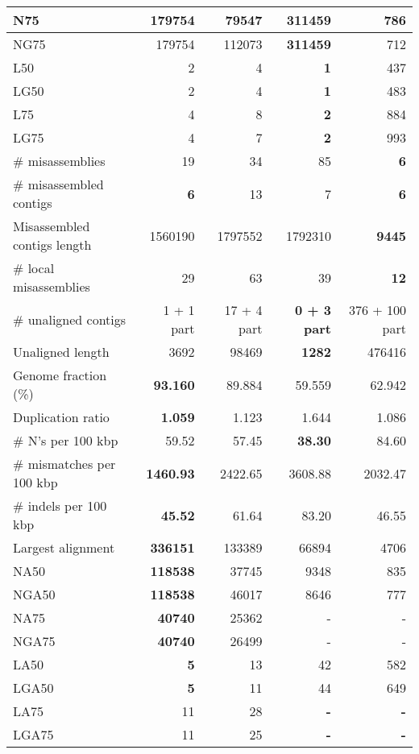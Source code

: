\documentclass[12pt,a4paper]{article}
\begin{document}
\begin{table}[ht]
\begin{center}
\begin{tabular}{|l*{4}{|r}|}
N75 & 179754 & 79547 & {\bf 311459} & 786 \\ \hline
NG75 & 179754 & 112073 & {\bf 311459} & 712 \\ \hline
L50 & 2 & 4 & {\bf 1} & 437 \\ \hline
LG50 & 2 & 4 & {\bf 1} & 483 \\ \hline
L75 & 4 & 8 & {\bf 2} & 884 \\ \hline
LG75 & 4 & 7 & {\bf 2} & 993 \\ \hline
\# misassemblies & 19 & 34 & 85 & {\bf 6} \\ \hline
\# misassembled contigs & {\bf 6} & 13 & 7 & {\bf 6} \\ \hline
Misassembled contigs length & 1560190 & 1797552 & 1792310 & {\bf 9445} \\ \hline
\# local misassemblies & 29 & 63 & 39 & {\bf 12} \\ \hline
\# unaligned contigs & 1 + 1 part & 17 + 4 part & {\bf 0 + 3 part} & 376 + 100 part \\ \hline
Unaligned length & 3692 & 98469 & {\bf 1282} & 476416 \\ \hline
Genome fraction (\%) & {\bf 93.160} & 89.884 & 59.559 & 62.942 \\ \hline
Duplication ratio & {\bf 1.059} & 1.123 & 1.644 & 1.086 \\ \hline
\# N's per 100 kbp & 59.52 & 57.45 & {\bf 38.30} & 84.60 \\ \hline
\# mismatches per 100 kbp & {\bf 1460.93} & 2422.65 & 3608.88 & 2032.47 \\ \hline
\# indels per 100 kbp & {\bf 45.52} & 61.64 & 83.20 & 46.55 \\ \hline
Largest alignment & {\bf 336151} & 133389 & 66894 & 4706 \\ \hline
NA50 & {\bf 118538} & 37745 & 9348 & 835 \\ \hline
NGA50 & {\bf 118538} & 46017 & 8646 & 777 \\ \hline
NA75 & {\bf 40740} & 25362 & - & - \\ \hline
NGA75 & {\bf 40740} & 26499 & - & - \\ \hline
LA50 & {\bf 5} & 13 & 42 & 582 \\ \hline
LGA50 & {\bf 5} & 11 & 44 & 649 \\ \hline
LA75 & 11 & 28 & {\bf -} & {\bf -} \\ \hline
LGA75 & 11 & 25 & {\bf -} & {\bf -} \\ \hline
\end{tabular}
\end{center}
\end{table}
\end{document}

